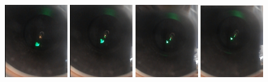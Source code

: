 \begin{figure}[h!]
\centering

\includegraphics[width=0.24\textwidth]{Figure/05/video/1.jpg}
\hfill
\includegraphics[width=0.24\textwidth]{Figure/05/video/2.jpg}
\hfill
\includegraphics[width=0.24\textwidth]{Figure/05/video/3.jpg}
\hfill
\includegraphics[width=0.24\textwidth]{Figure/05/video/4.jpg}
\vfill


\end{figure}
